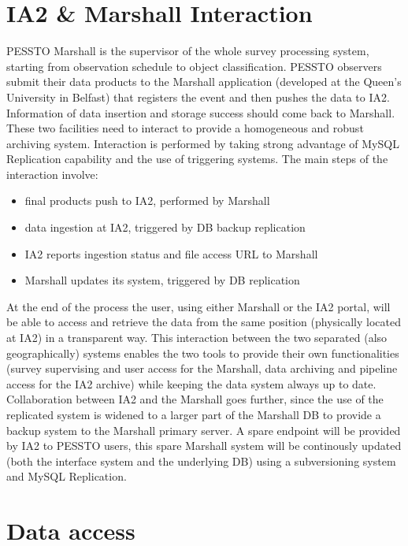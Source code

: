\section{IA2 \& Marshall Interaction}\label{ia2marshall}

PESSTO Marshall is the supervisor of the whole survey processing system, starting from observation schedule to object classification. PESSTO observers submit their data products to the Marshall application (developed at the Queen's University in Belfast) that registers the event and then pushes the data to IA2. Information of data insertion and storage success should come back to Marshall. These two facilities need to interact to provide a homogeneous and robust archiving system. Interaction is performed by taking strong advantage of MySQL Replication capability and the use of triggering systems. The main steps of the interaction involve:
\begin{itemize}[noitemsep,nolistsep]
	\item final products push to IA2, performed by Marshall
	\item data ingestion at IA2, triggered by DB backup replication
	\item IA2 reports ingestion status and file access URL to Marshall
	\item Marshall updates its system, triggered by DB replication
\end{itemize} 
At the end of the process the user, using either Marshall or the IA2 portal, will be able to access and retrieve the data from the same position (physically located at IA2) in a transparent way. This interaction between the two separated (also geographically) systems enables the two tools to provide their own functionalities (survey supervising and user access for the Marshall, data archiving and pipeline access for the IA2 archive) while keeping the data system always up to date. Collaboration between IA2 and the Marshall goes further, since the use of the replicated system is widened to a larger part of the Marshall DB to provide a backup system to the Marshall primary server. A spare endpoint will be provided by IA2 to PESSTO users, this spare Marshall system will be continously updated (both the interface system and the underlying DB) using a subversioning system and MySQL Replication.

\section{Data access}\label{dataaccess}

